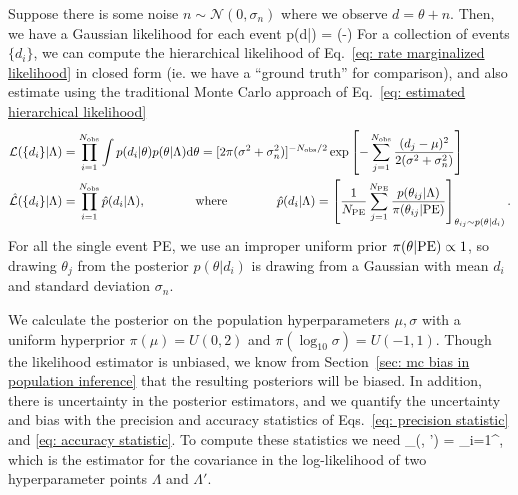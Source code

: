 \documentclass[%
 reprint,
 amsmath,amssymb,
 aps,nofootinbib,nobibnotes,onecolumn,prd
]{revtex4-2}
\begin{document}
Suppose there is some noise $n\sim\mathcal{N}(0, \sigma_n)$ where we observe $d=\theta+n$. Then, we have a Gaussian likelihood for each event
\beq
p(d|\theta) = \exp\left(-\right)
\eeq
For a collection of events $\{d_i\}$, we can compute the hierarchical likelihood of Eq.~\ref{eq: rate marginalized likelihood} in closed form (ie. we have a ``ground truth'' for comparison), and also estimate using the traditional Monte Carlo approach of Eq.~\ref{eq: estimated hierarchical likelihood}
\begin{align}
\mathcal{L}(\{d_i\}|\Lambda) &= \prod_{i=1}^{N_{\rm obs}} \int p(d_i|\theta)p(\theta|\Lambda)\dd\theta = [2\pi(\sigma^2 + \sigma_n^2)]^{-N_{\rm obs} / 2}\exp\left[-\sum_{j=1}^{N_{\rm obs}}\frac{(d_j - \mu)^2}{2(\sigma^2 + \sigma_n^2)}\right] 
\label{eq: analytic gaussian likelihood} \\
\hat{\mathcal{L}}(\{d_i\}|\Lambda) &= \prod_{i=1}^{N_{\rm obs}}\hat{p}(d_i|\Lambda),
\qquad\qquad{\rm where}\qquad\qquad
\hat{p}(d_i|\Lambda)=\left[\frac{1}{N_{\rm PE}}\sum_{j=1}^{N_{\rm PE}}\frac{p(\theta_{ij}|\Lambda)}{\pi(\theta_{ij}|{\rm PE})}\right]_{\theta_{ij} \sim p(\theta|d_i)}.
\label{eq: estimated gaussian likelihood}
\end{align}
For all the single event \ac{PE}, we use an improper uniform prior $\pi(\theta|{\rm PE})\propto 1$, so drawing $\theta_j$ from the posterior $p(\theta|d_i)$ is drawing from a Gaussian with mean $d_i$ and standard deviation $\sigma_n$. 

We calculate the posterior on the population hyperparameters $\mu, \sigma$ with a uniform hyperprior $\pi(\mu)=U(0,2)$ and $\pi(\log_{10}\sigma) = U(-1,1)$.
Though the likelihood estimator is unbiased, we know from Section~\ref{sec: mc bias in population inference} that the resulting posteriors will be biased. In addition, there is uncertainty in the posterior estimators, and we quantify the uncertainty and bias with the precision and accuracy statistics of Eqs.~\ref{eq: precision statistic} and \ref{eq: accuracy statistic}. To compute these statistics we need
\beq
{}_{\ln{}}(\Lambda, \Lambda') =  \sum_{i=1}^{\Nobs},
\label{eq: gaussian example covariance}
\eeq
which is the estimator for the covariance in the log-likelihood of two hyperparameter points $\Lambda$ and $\Lambda'$. 
\end{document}
